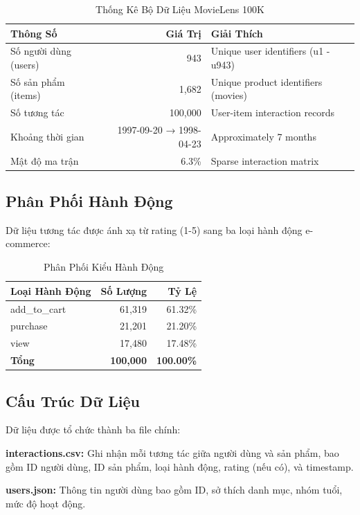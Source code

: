 \documentclass[12pt,a4paper]{article}
\begin{document}
\begin{table}[H]
\centering
\begin{tabular}{|l|r|l|}
\hline
\textbf{Thông Số} & \textbf{Giá Trị} & \textbf{Giải Thích} \\
\hline
Số người dùng (users) & 943 & Unique user identifiers (u1 - u943) \\
Số sản phẩm (items) & 1,682 & Unique product identifiers (movies) \\
Số tương tác & 100,000 & User-item interaction records \\
Khoảng thời gian & 1997-09-20 → 1998-04-23 & Approximately 7 months \\
Mật độ ma trận & 6.3\% & Sparse interaction matrix \\
\hline
\end{tabular}
\caption{Thống Kê Bộ Dữ Liệu MovieLens 100K}
\end{table}

\subsection{Phân Phối Hành Động}

Dữ liệu tương tác được ánh xạ từ rating (1-5) sang ba loại hành động e-commerce:

\begin{table}[H]
\centering
\begin{tabular}{|l|r|r|}
\hline
\textbf{Loại Hành Động} & \textbf{Số Lượng} & \textbf{Tỷ Lệ} \\
\hline
add\_to\_cart & 61,319 & 61.32\% \\
purchase & 21,201 & 21.20\% \\
view & 17,480 & 17.48\% \\
\hline
\textbf{Tổng} & \textbf{100,000} & \textbf{100.00\%} \\
\hline
\end{tabular}
\caption{Phân Phối Kiểu Hành Động}
\end{table}

\subsection{Cấu Trúc Dữ Liệu}

Dữ liệu được tổ chức thành ba file chính:

\textbf{interactions.csv:} Ghi nhận mỗi tương tác giữa người dùng và sản phẩm, bao gồm ID người dùng, ID sản phẩm, loại hành động, rating (nếu có), và timestamp.

\textbf{users.json:} Thông tin người dùng bao gồm ID, sở thích danh mục, nhóm tuổi, mức độ hoạt động.
\end{document}
